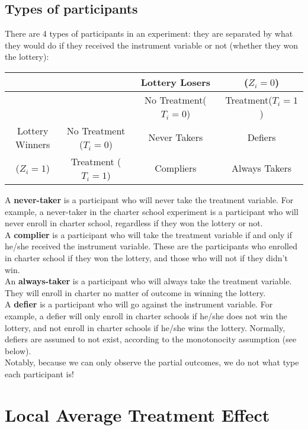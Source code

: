\documentclass{article}
\begin{document}
\subsection{Types of participants}
There are 4 types of participants in an experiment: they are separated by what they would do if they received the instrument variable or not (whether they won the lottery):
\begin{center}
    \begin{tabular}{c|ccc}
        &&Lottery Losers&($Z_i = 0$) \\ 
        \hline
         & &No Treatment($T_i=0$)&Treatment($T_i=1$) \\
         Lottery Winners &No Treatment ($T_i=0$)&Never Takers&Defiers  \\
         ($Z_i = 1$) &Treatment ($T_i=1$)&Compliers&Always Takers \\
    \end{tabular}
\end{center}
A \textbf{never-taker} is a participant who will never take the treatment variable.
For example, a never-taker in the charter school experiment is a participant who will never enroll in charter school, regardless if they won the lottery or not.
\\
A \textbf{complier} is a participant who will take the treatment variable if and only if he/she received the instrument variable. 
These are the participants who enrolled in charter school if they won the lottery, and those who will not if they didn't win.
\\
An \textbf{always-taker} is a participant who will always take the treatment variable.
They will enroll in charter no matter of outcome in winning the lottery.
\\
A \textbf{defier} is a participant who will go against the instrument variable. 
For example, a defier will only enroll in charter schools if he/she does not win the lottery, and not enroll in charter schools if he/she wins the lottery.
Normally, defiers are assumed to not exist, according to the monotonocity assumption (see below). 
\\
Notably, because we can only observe the partial outcomes, we do not what type each participant is!



\section{Local Average Treatment Effect}
\end{document}
